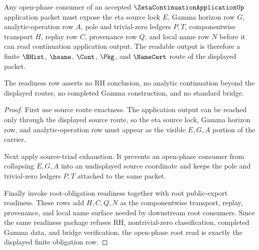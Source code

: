 \begin{theorem}
\label{thm:zeta-continuation-application-open-phase-root-readiness}
Any open-phase consumer of an accepted $\ZetaContinuationApplicationUp$
application packet must expose the eta source lock $E$, Gamma horizon row $G$,
analytic-operation row $A$, pole and trivial-zero ledgers $P,T$,
componentwise transport $H$, replay row $C$, provenance row $Q$, and local
name row $N$ before it can read continuation application output. The readable
output is therefore a finite $\BHist$, $\hsame$, $\Cont$, $\Pkg$, and
$\NameCert$ route of the displayed packet.

The readiness row asserts no RH conclusion, no analytic continuation beyond
the displayed routes, no completed Gamma construction, and no standard bridge.
\end{theorem}
\begin{proof}
First use source route exactness. The application output can be reached only
through the displayed source route, so the eta source lock, Gamma horizon row,
and analytic-operation row must appear as the visible $E,G,A$ portion of the
carrier.

Next apply source-triad exhaustion. It prevents an open-phase consumer from
collapsing $E,G,A$ into an undisplayed source coordinate and keeps the pole and
trivial-zero ledgers $P,T$ attached to the same packet.

Finally invoke root-obligation readiness together with root public-export
readiness. These rows add $H,C,Q,N$ as the componentwise transport, replay,
provenance, and local name surface needed by downstream root consumers. Since
the same readiness package refuses RH, nontrivial-zero classification,
completed Gamma data, and bridge verification, the open-phase root read is
exactly the displayed finite obligation row.
\end{proof}

